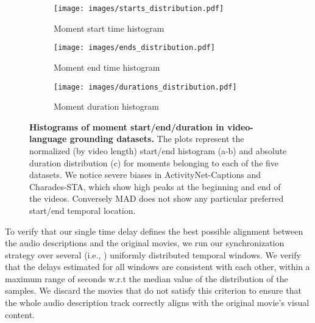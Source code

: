 \documentclass[10pt,twocolumn,letterpaper]{article}
\begin{document}
\begin{figure*}[ht!]
    \vspace{-0.2cm}
    \centering
    \begin{subfigure}[t]{0.325\linewidth}
        \centering
        \texttt{[image: images/starts\_distribution.pdf]}
        \caption{Moment start time histogram}
        \label{fig:starts}
    \end{subfigure}\begin{subfigure}[t]{0.31\linewidth}
        \centering
        \texttt{[image: images/ends\_distribution.pdf]}
        \caption{Moment end time histogram}
        \label{fig:ends}
    \end{subfigure}\begin{subfigure}[t]{0.35\linewidth}
        \centering
        \texttt{[image: images/durations\_distribution.pdf]}
        \caption{Moment duration histogram}
        \label{fig:durations}
    \end{subfigure}
    \caption{\textbf{Histograms of moment start/end/duration in video-language grounding datasets.} The plots represent the normalized (by video length) start/end histogram (a-b) and absolute duration distribution (c) for moments belonging to each of the five datasets. We notice severe biases in ActivityNet-Captions and Charades-STA, which show high peaks at the beginning and end of the videos. Conversely MAD does not show any particular preferred start/end temporal location.
    }
    \label{fig:dataset-attributes}
    \vspace{-0.4cm}
\end{figure*}
 To verify that our single time delay  defines the best possible alignment between the audio descriptions and the original movies, we run our synchronization strategy over several (i.e., ) uniformly distributed temporal windows. 
We verify that the delays estimated for all windows are consistent with each other, within a maximum range of  seconds w.r.t the median value of the distribution of the  samples. We discard the movies that do not satisfy this criterion to ensure that the whole audio description track correctly aligns with the original movie's visual content.
\end{document}
